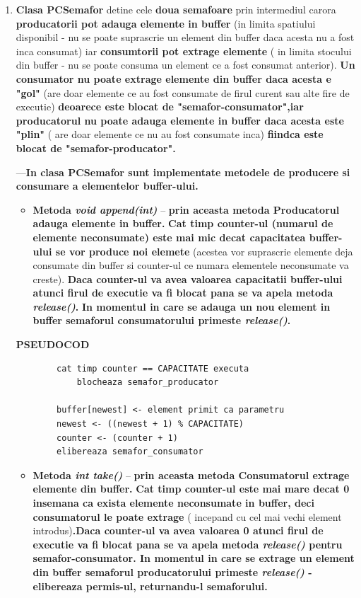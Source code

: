 \documentclass[14pt]{article}
\begin{document}
\begin{enumerate}
\item \textbf{Clasa PCSemafor} detine cele \textbf{doua semafoare} prin intermediul carora \textbf{producatorii pot adauga elemente in buffer} (in limita spatiului disponibil - nu se poate suprascrie un element din buffer daca acesta nu a fost inca consumat) iar \textbf{consumtorii pot extrage elemente }( in limita stocului din buffer - nu se poate consuma un element ce a fost consumat anterior). \textbf{Un consumator nu poate extrage elemente din buffer daca acesta e "gol"} (are doar elemente ce au fost consumate de firul curent sau alte fire de executie) \textbf{deoarece este blocat de "semafor-consumator",iar producatorul nu poate adauga elemente in buffer daca acesta este "plin"} ( are doar elemente ce nu au fost consumate inca) \textbf{fiindca este blocat de "semafor-producator".}



---\textbf{In clasa PCSemafor sunt implementate metodele de producere si consumare a elementelor buffer-ului. }



\begin{itemize}
\item \textbf{Metoda\textit{ void append(int)}} -- \textbf{prin aceasta metoda Producatorul adauga elemente in buffer. }\textbf{Cat timp counter-ul (numarul de elemente neconsumate) este mai mic decat capacitatea buffer-ului se vor produce noi elemete} (acestea vor suprascrie elemente deja consumate din buffer si counter-ul ce numara elementele neconsumate va creste).\textbf{ Daca counter-ul va avea valoarea capacitatii buffer-ului  atunci firul de executie  va fi blocat pana se va apela metoda \textit{release()}. }\textbf{In momentul in care se adauga un nou element in buffer semaforul consumatorului primeste \textit{release()}.}
\end{itemize}

 \textbf{PSEUDOCOD}
 \begin{lstlisting}
		cat timp counter == CAPACITATE executa
			blocheaza semafor_producator				

		buffer[newest] <- element primit ca parametru
		newest <- ((newest + 1) % CAPACITATE)
		counter <- (counter + 1)
		elibereaza semafor_consumator
\end{lstlisting}


\begin{itemize}
\item \textbf{Metoda\textit{ int take()}} --\textbf{ prin aceasta metoda Consumatorul extrage elemente din buffer.}\textbf{ Cat timp counter-ul este mai mare decat 0 insemana ca exista elemente neconsumate in buffer, deci consumatorul le poate extrage} ( incepand cu  cel mai vechi element introdus)\textbf{.Daca counter-ul va avea valoarea 0 atunci firul de executie va fi blocat pana se va apela metoda \textit{release()} pentru semafor-consumator. In momentul in care se extrage un element din buffer semaforul producatorului primeste \textit{release()} - elibereaza permis-ul, returnandu-l semaforului.}
\end{itemize}



\end{enumerate}
\end{document}
